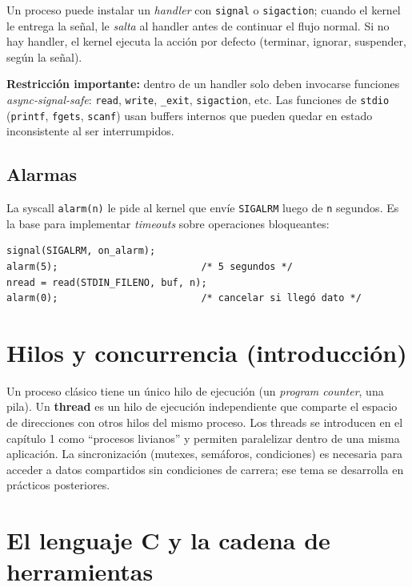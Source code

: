\documentclass[11pt,a4paper]{article}
\begin{document}
Un proceso puede instalar un \emph{handler} con \texttt{signal} o
\texttt{sigaction}; cuando el kernel le entrega la señal, le
\emph{salta} al handler antes de continuar el flujo normal. Si no hay
handler, el kernel ejecuta la acción por defecto (terminar, ignorar,
suspender, según la señal).

\textbf{Restricción importante:} dentro de un handler solo deben
invocarse funciones \emph{async-signal-safe}: \texttt{read},
\texttt{write}, \texttt{\_exit}, \texttt{sigaction}, etc. Las
funciones de \texttt{stdio} (\texttt{printf}, \texttt{fgets},
\texttt{scanf}) usan buffers internos que pueden quedar en estado
inconsistente al ser interrumpidos.

\subsection{Alarmas}

La syscall \texttt{alarm(n)} le pide al kernel que envíe
\texttt{SIGALRM} luego de \texttt{n} segundos. Es la base para
implementar \emph{timeouts} sobre operaciones bloqueantes:

\begin{lstlisting}[style=cstyle]
signal(SIGALRM, on_alarm);
alarm(5);                         /* 5 segundos */
nread = read(STDIN_FILENO, buf, n);
alarm(0);                         /* cancelar si llegó dato */
\end{lstlisting}

\section{Hilos y concurrencia (introducción)}

Un proceso clásico tiene un único hilo de ejecución (un \emph{program
counter}, una pila). Un \textbf{thread} es un hilo de ejecución
independiente que comparte el espacio de direcciones con otros hilos
del mismo proceso. Los threads se introducen en el capítulo 1 como
``procesos livianos'' y permiten paralelizar dentro de una misma
aplicación. La sincronización (mutexes, semáforos, condiciones) es
necesaria para acceder a datos compartidos sin condiciones de carrera;
ese tema se desarrolla en prácticos posteriores.

\section{El lenguaje C y la cadena de herramientas}
\end{document}
